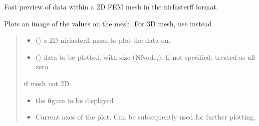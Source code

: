 \documentclass[letterpaper,10pt,english]{sphinxmanual}
\begin{document}
\begin{fulllineitems}
\label{\detokenize{_autosummary/nirfasterff.visualize.plotimage:nirfasterff.visualize.plotimage}}
\pysigstartsignatures
{}
\pysigstopsignatures
\sphinxAtStartPar
Fast preview of data within a 2D FEM mesh in the nirfasterff format.

\sphinxAtStartPar
Plots an image of the values on the mesh. For 3D mesh, use {\hyperref[\detokenize{_autosummary/nirfasterff.visualize.plot3dmesh:nirfasterff.visualize.plot3dmesh}]{}} instead
\begin{quote}\begin{description}
\begin{itemize}
\item {} 
\sphinxAtStartPar
{} () \textendash{} a 2D nirfasterff mesh to plot the data on.

\item {} 
\sphinxAtStartPar
{} (\sphinxstyleliteralemphasis{\sphinxupquote{, }}) \textendash{} data to be plotted, with size (NNode,). If not specified, treated as all zero.

\end{itemize}

\sphinxAtStartPar
{} \textendash{} if mesh not 2D.

\sphinxAtStartPar
\begin{itemize}
\item {} 
\sphinxAtStartPar
{} \textendash{} the figure to be displayed

\item {} 
\sphinxAtStartPar
{} \textendash{} Current axes of the plot. Can be subsequently used for further plotting.

\end{itemize}


\end{description}\end{quote}

\end{fulllineitems}
\end{document}
